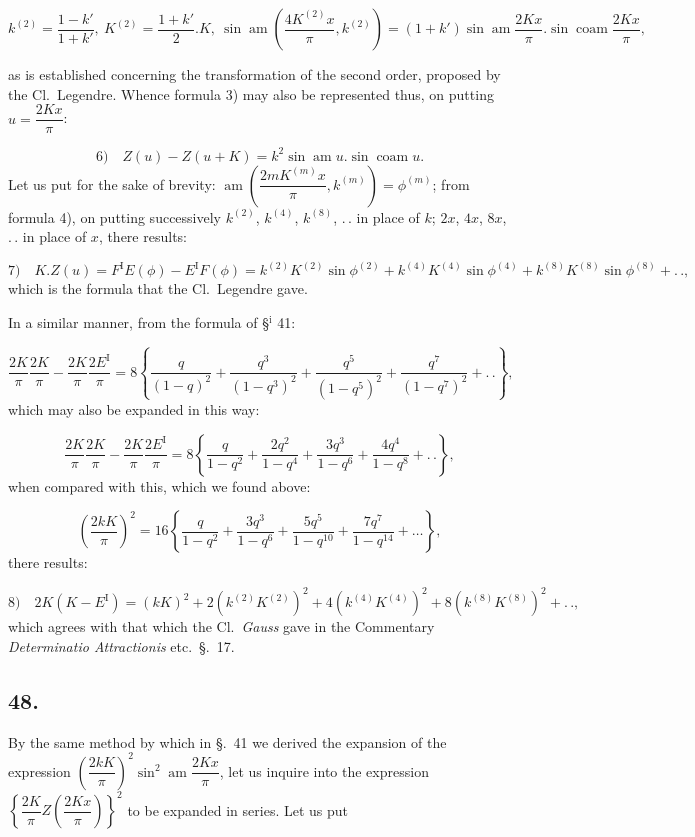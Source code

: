 \documentclass{article}
\begin{document}
\[
k^{(2)}=\frac{1-k'}{1+k'},\ K^{(2)}=\frac{1+k'}{2}.K,\ \sin\operatorname{am}\left(\frac{4K^{(2)}x}{\pi},k^{(2)}\right)=(1+k')\sin\operatorname{am}\frac{2Kx}{\pi}.\sin\operatorname{coam}\frac{2Kx}{\pi},
\]

as is established concerning the transformation of the second order, proposed by the Cl.\ Legendre. Whence formula 3) may also be represented thus, on putting $u=\dfrac{2Kx}{\pi}$:

\[
\text{6)}\quad Z(u)-Z(u+K)=k^{2}\sin\operatorname{am}u.\sin\operatorname{coam}u.
\]
Let us put for the sake of brevity: $\operatorname{am}\left(\dfrac{2mK^{(m)}x}{\pi},k^{(m)}\right)=\phi^{(m)}$; from formula 4), on putting successively $k^{(2)}$, $k^{(4)}$, $k^{(8)}$, $.\,.$ in place of $k$; $2x$, $4x$, $8x$, $.\,.$ in place of $x$, there results:

\[
\text{7)}\quad K.Z(u)=F^{\mathrm{I}}E(\phi)-E^{\mathrm{I}}F(\phi)=k^{(2)}K^{(2)}\sin\phi^{(2)}+k^{(4)}K^{(4)}\sin\phi^{(4)}+k^{(8)}K^{(8)}\sin\phi^{(8)}+.\,.,
\]
which is the formula that the Cl.\ Legendre gave.

In a similar manner, from the formula of §$^{\mathrm{i}}$ 41:

\[
\frac{2K}{\pi}\frac{2K}{\pi}-\frac{2K}{\pi}\frac{2E^{\mathrm{I}}}{\pi}=8\left\{\frac{q}{(1-q)^{2}}+\frac{q^{3}}{(1-q^{3})^{2}}+\frac{q^{5}}{(1-q^{5})^{2}}+\frac{q^{7}}{(1-q^{7})^{2}}+.\,.\right\},
\]
which may also be expanded in this way:

\[
\frac{2K}{\pi}\frac{2K}{\pi}-\frac{2K}{\pi}\frac{2E^{\mathrm{I}}}{\pi}=8\left\{\frac{q}{1-q^{2}}+\frac{2q^{2}}{1-q^{4}}+\frac{3q^{3}}{1-q^{6}}+\frac{4q^{4}}{1-q^{8}}+.\,.\right\},
\]
when compared with this, which we found above:

\[
\left(\frac{2kK}{\pi}\right)^{2}=16\left\{\frac{q}{1-q^{2}}+\frac{3q^{3}}{1-q^{6}}+\frac{5q^{5}}{1-q^{10}}+\frac{7q^{7}}{1-q^{14}}+\ldots\right\},
\]
there results:

\[
\text{8)}\quad2K(K-E^{\mathrm{I}})=(kK)^{2}+2(k^{(2)}K^{(2)})^{2}+4(k^{(4)}K^{(4)})^{2}+8(k^{(8)}K^{(8)})^{2}+.\,.,
\]
which agrees with that which the Cl.\ \emph{Gauss} gave in the Commentary \emph{Determinatio Attractionis} etc.\ §.\ 17.

\subsection*{48.}

By the same method by which in §.\ 41 we derived the expansion of the expression $\left(\dfrac{2kK}{\pi}\right)^{2}\sin^{2}\operatorname{am}\dfrac{2Kx}{\pi}$, let us inquire into the expression $\left\{\dfrac{2K}{\pi}Z\left(\dfrac{2Kx}{\pi}\right)\right\}^{2}$ to be expanded in series. Let us put
\end{document}
